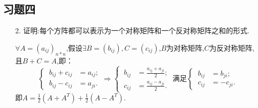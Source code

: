 \documentclass{article}
\begin{document}
    \subsection{习题四}
    \begin{enumerate}
        \item [2.]证明:每个方阵都可以表示为一个对称矩阵和一个反对称矩阵之和的形式.
        
        $\forall A={(a_{ij})}_{n*n}$,假设$\exists B=(b_{ij}),C=(c_{ij})$,$B$为对称矩阵,$C$为反对称矩阵,且$B+C=A$,即：
        \[
            \begin{cases}
                \ b_{ij}+c_{ij}&=a_{ij};\\
                \ b_{ij}-c_{ij}&=a_{ji}.
            \end{cases}
            \Rightarrow
            \begin{cases}
                \ b_{ij}&=\displaystyle{\frac{a_{ij}+a_{ji}}{2}};\\
                \ c_{ij}&=\displaystyle{\frac{a_{ij}-a_{ji}}{2}}.
            \end{cases}
            \ \mbox{满足}
            \begin{cases}
                \ b_{ij}&=b_{ji};\\
                \ c_{ij}&=-c_{ji}.
            \end{cases}
        \]
        即$A=\frac{1}{2}(A+A^T)+\frac{1}{2}(A-A^T)$.


\end{enumerate}
\end{document}
